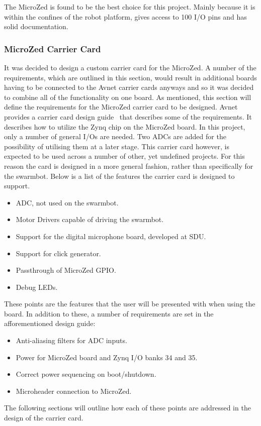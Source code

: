 The MicroZed is found to be the best choice for this project.
Mainly because it is within the confines of the robot platform, gives access to 100 I/O pins and has solid documentation.

\subsubsection*{MicroZed Carrier Card}
It was decided to design a custom carrier card for the MicroZed.
A number of the requirements, which are outlined in this section, would result in additional boards having to be connected to the Avnet carrier cards anyways and so it was decided to combine all of the functionality on one board.
As mentioned, this section will define the requirements for the MicroZed carrier card to be designed.
Avnet provides a carrier card design guide~\cite{design_carrier} that describes some of the requirements.
It describes how to utilize the Zynq chip on the MicroZed board.
In this project, only a number of general I/Os are needed.
Two ADCs are added for the possibility of utilising them at a later stage.
This carrier card however, is expected to be used across a number of other, yet undefined projects.
For this reason the card is designed in a more general fashion, rather than specifically for the swarmbot.
Below is a list of the features the carrier card is designed to support.
\begin{itemize}
	\item ADC, not used on the swarmbot.
	\item Motor Drivers capable of driving the swarmbot.
	\item Support for the digital microphone board, developed at SDU.
	\item Support for click generator.
	\item Passthrough of MicroZed GPIO.
	\item Debug LEDs.
\end{itemize}

These points are the features that the user will be presented with when using the board.
In addition to these, a number of requirements are set in the afforementioned design guide:

\begin{itemize}
	\item Anti-aliasing filters for ADC inputs.
	\item Power for MicroZed board and Zynq I/O banks 34 and 35.
	\item Correct power sequencing on boot/shutdown.
	\item Microheader connection to MicroZed.
\end{itemize}

The following sections will outline how each of these points are addressed in the design of the carrier card.
